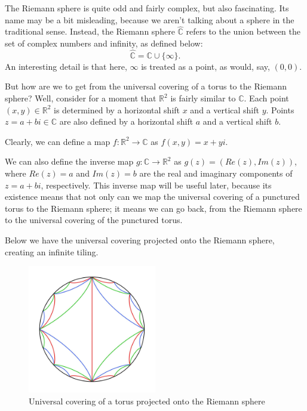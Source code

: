 \documentclass[12pt,a4paper,reqno,parskip=full]{amsart}
\numberwithin{equation}{section}
\theoremstyle{plain}
\theoremstyle{definition}
\def\R{{\mathbb R}}
\def\C{{\mathbb C}}
\begin{document}

The Riemann sphere is quite odd and fairly complex, but also fascinating. Its name may be a bit misleading, because we aren't talking about a sphere in the traditional sense. Instead, the Riemann sphere $\hat\C$ refers to the union between the set of complex numbers and infinity, as defined below:
\[\hat\C=\C\cup\{\infty\}.\]
An interesting detail is that here, $\infty$ is treated as a point, as would, say, $(0,0)$. 

But how are we to get from the universal covering of a torus to the Riemann sphere? Well, consider for a moment that $\R^2$ is fairly similar to $\C$. Each point $(x,y)\in\R^2$ is determined by a horizontal shift $x$ and a vertical shift $y$. Points $z=a+bi\in\C$ are also defined by a horizontal shift $a$ and a vertical shift $b$. 

Clearly, we can define a map $f:\R^2\to\C$ as $f(x,y)=x+yi$.

We can also define the inverse map $g:\C\to\R^2$ as $g(z)=(Re(z),Im(z))$, where $Re(z)=a$ and $Im(z)=b$ are the real and imaginary components of $z=a+bi$, respectively. This inverse map will be useful later, because its existence means that not only can we map the universal covering of a punctured torus to the Riemann sphere; it means we can go back, from the Riemann sphere to the universal covering of the punctured torus.

Below we have the universal covering projected onto the Riemann sphere, creating an infinite tiling.
\begin{figure}[H]
    \centering
    \includegraphics[width=0.5\textwidth]{images/RS colored detailed.jpg}
    \caption{Universal covering of a torus projected onto the Riemann sphere}
\end{figure}
\end{document}
